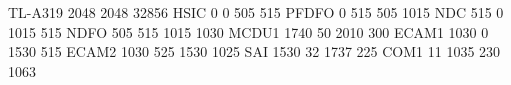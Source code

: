 TL-A319 2048 2048 32856
HSIC            0     0   505   515
PFDFO           0   515   505  1015
NDC           515     0  1015   515
NDFO          505   515  1015  1030
MCDU1        1740    50  2010   300
ECAM1        1030     0  1530   515
ECAM2        1030   525  1530  1025
SAI          1530    32  1737   225
COM1           11  1035   230  1063
